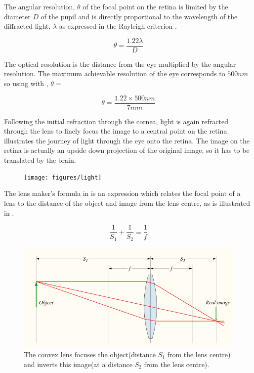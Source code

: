 The angular resolution, $\theta$ of the focal point on the retina is limited by
the diameter $D$ of the pupil and is directly proportional to the wavelength
of the diffracted light, $\lambda$ as expressed in the Rayleigh criterion
 .\cite{rayleigh1907dynamical}

\begin{equation}
\theta=\frac{1.22\lambda}{D}
\label{eq:res_limit}
\end{equation}

The optical resolution is the distance from the eye multiplied by the angular
resolution. The maximum achievable resolution of the eye corresponds to
$500nm$ so using  with , $\theta=$.

\begin{equation}
\theta=\frac{1.22\times 500nm}{7mm}
\label{eq:eye_res}
\end{equation}

Following the initial refraction through the cornea, light is again refracted
through the lens to finely focus the image to a central point on the retina.
 illustrates the journey of light through the eye
onto the retina. The image on the retina is actually an upside down
projection of the original image, so it has to be translated by the brain.

\begin{figure}[!ht]
\centering
  \texttt{[image: figures/light]}
\caption{}
\label{fig:light_journey}
\end{figure}

The lens maker’s formula in  is an expression which relates the
focal point of a lens to the distance of the object and image from the lens centre,
as is illustrated in .

\begin{equation}
\frac{1}{S_1} + \frac{1}{S_2} = \frac{1}{f}
\label{eq:lens_makers}
\end{equation}

\begin{figure}[htbp]
\centering
  \includegraphics{figures/convergent_lens2}
\caption{The convex lens focuses the object(distance $S_1$ from the lens centre)
         and inverts this image(at a distance $S_2$ from the lens centre).
         \cite{greivenkamp2004field}}
\label{fig:convergent_lens}
\end{figure}

